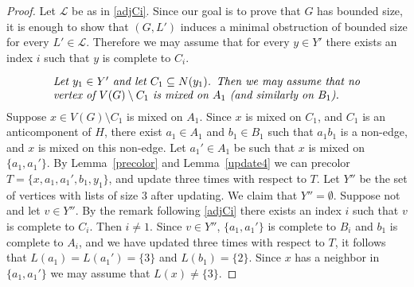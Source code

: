 \documentclass[11pt]{article}
\begin{document}
\begin{proof}
\bigskip

Let $\mathcal{L}$ be as in \eqref{adjCi}.
Since our goal is to prove that $G$ has bounded size, it is enough to show that $(G,L')$ induces a minimal
obstruction of bounded size for every $L' \in \mathcal{L}$.
Therefore we may assume that for every $y \in Y'$ there exists an index $i$ 
such that $y$ is complete to $C_i$. 



\begin{equation}\label{hpair}
\begin{minipage}[c]{0.8\textwidth}\em
Let $y_1 \in Y'$ and let $C_1 \subseteq N(y_1)$.
Then we may assume that no vertex of $V(G) \setminus C_1$ is mixed on $A_1$ (and similarly on $B_1$).
\end{minipage}
\end{equation}
Suppose $x \in V(G) \setminus C_1$ is mixed on $A_1$. 
Since $x$ is mixed on $C_1$, and $C_1$ is an anticomponent of $H$, there exist $a_1\in A_1$
and $b_1\in B_1$ such that $a_1b_1$ is a non-edge, and $x$ is mixed on this non-edge.
Let $a_1' \in A_1$ be such that $x$ is mixed on $\{a_1,a_1'\}$. 
By Lemma~\ref{precolor} and Lemma~\ref{update4} we can precolor $T=\{x,a_1,a_1',b_1,y_1\}$,
and update three times with respect to $T$. 
Let $Y''$ be the set of vertices with lists of size $3$ after updating. We 
claim that  $Y''=\emptyset$.
Suppose not and let $v\in Y''$. 
By the remark following \eqref{adjCi} there exists an index $i$ such that $v$ is complete to $C_i$. 
Then $i \neq 1$.
Since $v \in Y''$, $\{a_1,a_1'\}$ is complete to $B_i$ and $b_1$ is complete 
to $A_i$,
and we have updated three times  with respect to $T$, it 
follows that $L(a_1)=L(a_1')=\{3\}$ and  $L(b_1)=\{2\}$.
Since $x$ has a neighbor in $\{a_1,a_1'\}$ we may assume that
$L(x) \neq \{3\}$. 


\end{proof}
\end{document}
